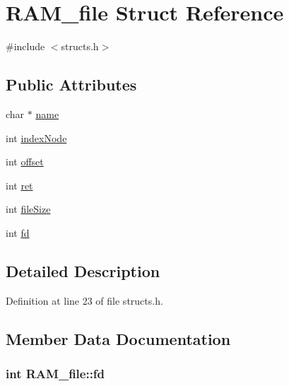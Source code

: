 \hypertarget{struct_r_a_m__file}{\section{R\-A\-M\-\_\-file Struct Reference}
\label{struct_r_a_m__file}
}


{\ttfamily \#include $<$structs.\-h$>$}

\subsection*{Public Attributes}
\begin{DoxyCompactItemize}
\item 
char $\ast$ \hyperlink{struct_r_a_m__file_ae1d9b6bcd499d80f7889b1b42edaa44e}{name}
\item 
int \hyperlink{struct_r_a_m__file_a2e9f0e53a40cfa76ff19c4abf2cb160a}{index\-Node}
\item 
int \hyperlink{struct_r_a_m__file_ab1bae1169c15ff2e8ff6b41b9b97764e}{offset}
\item 
int \hyperlink{struct_r_a_m__file_a9f619fbe5222d9f0a30e27db9c263c78}{ret}
\item 
int \hyperlink{struct_r_a_m__file_aaa19f9267c6de8acebcab0918d9e3d92}{file\-Size}
\item 
int \hyperlink{struct_r_a_m__file_ae30ef0ae2fe317b94fed81e85d7896f1}{fd}
\end{DoxyCompactItemize}


\subsection{Detailed Description}


Definition at line 23 of file structs.\-h.



\subsection{Member Data Documentation}
\hypertarget{struct_r_a_m__file_ae30ef0ae2fe317b94fed81e85d7896f1}{
\subsubsection[{fd}]{\setlength{\rightskip}{0pt plus 5cm}int R\-A\-M\-\_\-file\-::fd}}\label{struct_r_a_m__file_ae30ef0ae2fe317b94fed81e85d7896f1}


